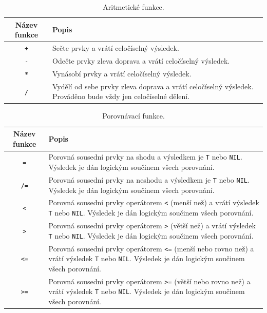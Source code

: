 \documentclass[12pt, a4paper]{report}
\begin{document}
\setlength{\tabcolsep}{0.5em} %
{\renewcommand{\arraystretch}{1.5}%

\begin{table}[ht]
	\caption{Aritmetické funkce.}
	\centering
	\vspace{5pt}
	
	\begin{tabular}{||c p{11cm}||} 
		\hline
		Název funkce & Popis \\ %
		\hline\hline
		\verb|+| & Sečte prvky a vrátí celočíselný výsledek. \\ 
		\hline
		\verb|-| & Odečte prvky zleva doprava a vrátí celočíselný výsledek. \\
		\hline
		\verb|*| & Vynásobí prvky a vrátí celočíselný výsledek. \\ 
		\hline
		\verb|/| & Vydělí od sebe prvky zleva doprava a vrátí celočíselný výsledek. Prováděno bude vždy jen celočíselné dělení. \\
		\hline
	\end{tabular}
\end{table}

\begin{table}[ht]
	\caption{Porovnávací funkce.}
	\centering
	\vspace{5pt}
	
	\begin{tabular}{||c p{11cm}||} 
		\hline
		Název funkce & Popis \\ %
		\hline\hline
		\verb|=| & Porovná sousední prvky na shodu a výsledkem je \verb|T| nebo \verb|NIL|. Výsledek je dán logickým součinem všech porovnání. \\
		\hline
		\verb|/=| & Porovná sousední prvky na neshodu a výsledkem je \verb|T| nebo \verb|NIL|. Výsledek je dán logickým součinem všech porovnání. \\ 
		\hline
		\verb|<| & Porovná sousední prvky operátorem \verb|<| (menší než) a vrátí výsledek \verb|T| nebo \verb|NIL|. Výsledek je dán logickým součinem všech porovnání. \\ 
		\hline
		\verb|>| & Porovná sousední prvky operátorem \verb|>| (větší než) a vrátí výsledek \verb|T| nebo \verb|NIL|. Výsledek je dán logickým součinem všech porovnání. \\ 
		\hline
		\verb|<=| & Porovná sousední prvky operátorem \verb|<=| (menší nebo rovno než) a vrátí výsledek \verb|T| nebo \verb|NIL|. Výsledek je dán logickým součinem všech porovnání. \\ 
		\hline
		\verb|>=| & Porovná sousední prvky operátorem \verb|>=| (větší nebo rovno než) a vrátí výsledek \verb|T| nebo \verb|NIL|. Výsledek je dán logickým součinem všech porovnání. \\
		\hline
	\end{tabular}
\end{table}

}
\end{document}
